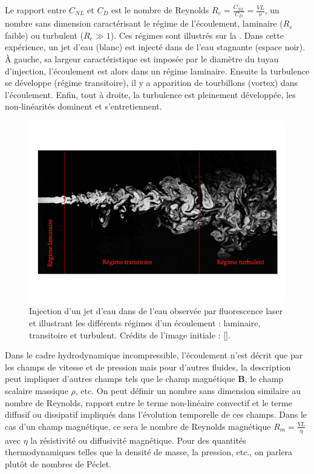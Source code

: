 Le rapport entre $C_{NL}$ et $C_D$ est le nombre de Reynolds $R_e = \frac{C_{NL}}{C_D} = \frac{VL}{\nu}$, un nombre sans dimension caractérisant le régime de l'écoulement, laminaire ($R_e$ faible) ou turbulent ($R_e \gg 1$). Ces régimes sont illustrés sur la . Dans cette expérience, un jet d'eau (blanc) est injecté dans de l'eau stagnante (espace noir). À gauche, sa largeur caractéristique est imposée par le diamètre du tuyau d'injection, l'écoulement est alors dans un régime laminaire. Ensuite la turbulence se développe (régime transitoire), il y a apparition de tourbillons (vortex) dans l'écoulement. Enfin, tout à droite, la turbulence est pleinement développée, les non-linéarités dominent et s'entretiennent. 
\begin{figure}[!ht]
 \centering
\includegraphics[width=\linewidth,trim=1cm 3cm 1cm 3cm, clip=true]{./Part_0/images/turbul_Re}
\cprotect\caption{Injection d'un jet d'eau dans de l'eau observée par fluorescence laser et illustrant les différents régimes d'un écoulement : laminaire, transitoire et turbulent. Crédits de l'image initiale : [\cite{van_dyke_album_1982}].}
\label{fig:ecoulement}
\end{figure}

Dans le cadre hydrodynamique incompressible, l'écoulement n'est décrit que par les champs de vitesse et de pression mais pour d'autres fluides, la description peut impliquer d'autres champs tels que le champ magnétique $\boldsymbol{B}$, le champ scalaire massique $\rho$, etc. On peut définir un nombre sans dimension similaire au nombre de Reynolds, rapport entre le terme non-linéaire convectif et le terme diffusif ou dissipatif impliqués dans l'évolution temporelle de ces champs. Dans le cas d'un champ magnétique, ce sera le nombre de Reynolds magnétique $R_m = \frac{VL}{\eta}$ avec $\eta$ la résistivité ou diffusivité magnétique. Pour des quantités thermodynamiques telles que la densité de masse, la pression, etc., on parlera plutôt de nombres de Péclet.

